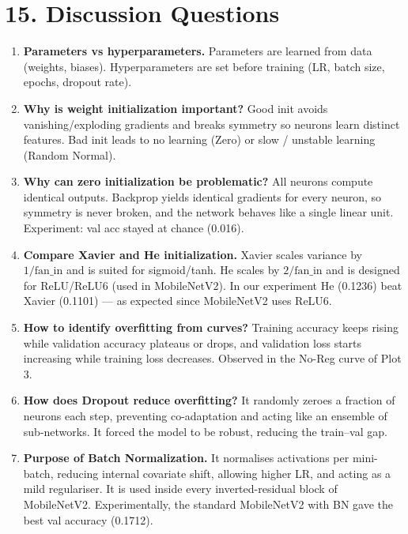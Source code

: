 \documentclass[10pt]{article}
\begin{document}
\section*{15. Discussion Questions}

\begin{enumerate}
\item \textbf{Parameters vs hyperparameters.} Parameters are learned from data (weights, biases). Hyperparameters are set before training (LR, batch size, epochs, dropout rate).

\item \textbf{Why is weight initialization important?} Good init avoids vanishing/exploding gradients and breaks symmetry so neurons learn distinct features. Bad init leads to no learning (Zero) or slow / unstable learning (Random Normal).

\item \textbf{Why can zero initialization be problematic?} All neurons compute identical outputs. Backprop yields identical gradients for every neuron, so symmetry is never broken, and the network behaves like a single linear unit. Experiment: val acc stayed at chance (0.016).

\item \textbf{Compare Xavier and He initialization.} Xavier scales variance by $1/\mathrm{fan\_in}$ and is suited for sigmoid/tanh. He scales by $2/\mathrm{fan\_in}$ and is designed for ReLU/ReLU6 (used in MobileNetV2). In our experiment He (0.1236) beat Xavier (0.1101) --- as expected since MobileNetV2 uses ReLU6.

\item \textbf{How to identify overfitting from curves?} Training accuracy keeps rising while validation accuracy plateaus or drops, and validation loss starts increasing while training loss decreases. Observed in the No-Reg curve of Plot 3.

\item \textbf{How does Dropout reduce overfitting?} It randomly zeroes a fraction of neurons each step, preventing co-adaptation and acting like an ensemble of sub-networks. It forced the model to be robust, reducing the train--val gap.

\item \textbf{Purpose of Batch Normalization.} It normalises activations per mini-batch, reducing internal covariate shift, allowing higher LR, and acting as a mild regulariser. It is used inside every inverted-residual block of MobileNetV2. Experimentally, the standard MobileNetV2 with BN gave the best val accuracy (0.1712).


\end{enumerate}
\end{document}
